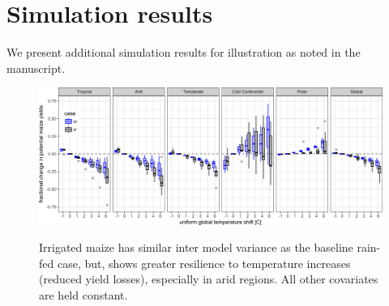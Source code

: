 \documentclass[10pt]{article}
\begin{document}
\clearpage
\section{Simulation results}
We present additional simulation results for illustration as noted in the manuscript. 


\begin{figure}[h!]
\includegraphics[width=\textwidth]{s_sim_KG_irr_all.png}\\
\caption{Irrigated maize has similar inter model variance as the baseline rain-fed case, but, shows greater resilience to temperature increases (reduced yield losses), especially in arid regions. All other covariates are held constant.}
\label{fig:KGirr_all}
\end{figure}
\end{document}
